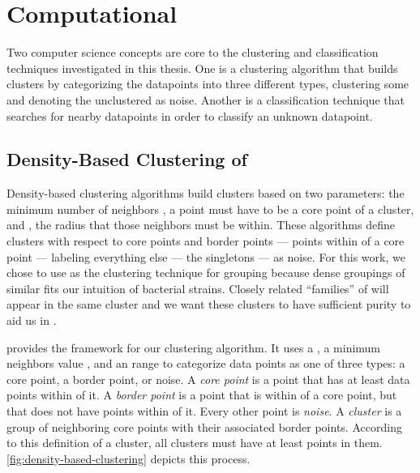 \section{Computational}
Two computer science concepts are core to the clustering and classification techniques investigated in this thesis.
One is a clustering algorithm that builds clusters by categorizing the datapoints into three different types, clustering some and denoting the unclustered as noise.
Another is a classification technique that searches for nearby datapoints in order to classify an unknown datapoint.


\subsection{Density-Based Clustering of \Isols{}}\label{sec:dbscan}
Density-based clustering algorithms build clusters based on two parameters: the minimum number of neighbors \minneigh{},  a point must have to be a core point of a cluster, and \eps{}, the radius that those neighbors must be within. 
These algorithms define clusters with respect to core points and border points --- points within \eps{} of a core point --- labeling everything else --- the singletons --- as noise.
For this work, we chose to use \dbscan{} as the clustering technique for grouping \isols{} because dense groupings of similar \isols{} fits our intuition of bacterial \isol{} strains.
Closely related ``families'' of \isols{} will appear in the same cluster and we want these clusters to have sufficient purity to aid us in \mst{}.


\dbscan{}\cite{ester1996density} provides the framework for our clustering algorithm. 
It uses a \distmetric{}, a minimum neighbors value \minneigh{}, and an \eps{} range to categorize data points as one of three types:
\index{\dbscan{}}
\index{\distmetric{}}
\index{\minneigh{}}
\index{\eps{}}
a core point, a border point, or noise.
A \textit{core point} is a point that has at least \minneigh{} data points within \eps{} of it. 
A \textit{border point} is a point that is within \eps{} of a core point, but that does not have \minneigh{} points within \eps{} of it.
Every other point is \textit{noise}. 
A \textit{cluster} is a group of neighboring core points with their associated border points.
According to this definition of a cluster, all clusters must have at least \minneigh{} points in them.
\autoref{fig:density-based-clustering} depicts this process.


